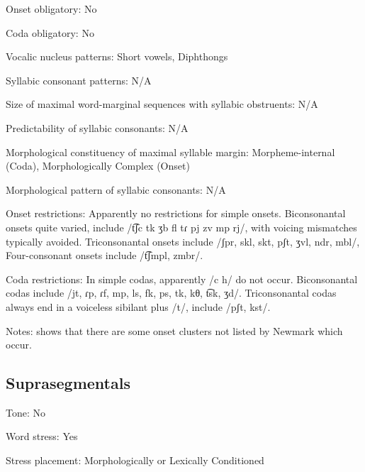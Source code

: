 {\begin{appendixdesc}
\item[Onset obligatory:] No

\item[Coda obligatory:] No

\item[Vocalic nucleus patterns:] Short vowels, Diphthongs

\item[Syllabic consonant patterns:] N/A

\item[Size of maximal word-marginal sequences with syllabic obstruents:] N/A

\item[Predictability of syllabic consonants:] N/A

\item[Morphological constituency of maximal syllable margin:] Morpheme-internal (Coda), Morphologically Complex (Onset)

\item[Morphological pattern of syllabic consonants:] N/A

\item[Onset restrictions:] Apparently no restrictions for simple onsets. Biconsonantal onsets quite varied, include /t͡ʃc tk ʒb fl tɾ pj zv mp rj/, with voicing mismatches typically avoided. Triconsonantal onsets include /ʃpr, skl, skt, pʃt, ʒvl, ndr, mbl/, Four-consonant onsets include /t͡ʃmpl, zmbr/.

\item[Coda restrictions:] In simple codas, apparently /c h/ do not occur. Biconsonantal codas include /jt, ɾp, ɾf, mp, ls, fk, ps, tk,  kθ, t͡sk, ʒd/. Triconsonantal codas always end in a voiceless sibilant plus /t/, include /pʃt, kst/.

\item[Notes:] \citet{Klippenstein2010} shows that there are some onset clusters not listed by Newmark which occur.
\end{appendixdesc}
\subsection*{Suprasegmentals}
\begin{appendixdesc}
\item[Tone:] No

\item[Word stress:] Yes

\item[Stress placement:] Morphologically or Lexically Conditioned


\end{appendixdesc}}
